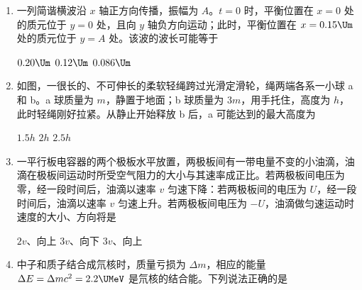 \documentclass[\gkver]{gaokaozhenti}
\begin{document}
\begin{enumerate}
\item
一列简谐横波沿 $x$ 轴正方向传播，振幅为 $A$。$t=0$ 时，平衡位置在 $x=0$ 处的质元位于 $y=0$ 处，且向 $y$ 轴负方向运动；此时，平衡位置在 $x=0.15\Um$ 处的质元位于 $y=A$ 处。该波的波长可能等于

\fourchoices[answer=AC]
{$0.60\Um$}
{$0.20\Um$}
{$0.12\Um$}
{$0.086\Um$}


\item
如图，一很长的、不可伸长的柔软轻绳跨过光滑定滑轮，绳两端各系一小球 a 和 b。a 球质量为 $m$，静置于地面；b 球质量为 $3m$，用手托住，高度为 $h$，此时轻绳刚好拉紧。从静止开始释放 b 后，a 可能达到的最大高度为


{$1.5h$}
{$2h$}
{$2.5h$}


\item
一平行板电容器的两个极板水平放置，两极板间有一带电量不变的小油滴，油滴在极板间运动时所受空气阻力的大小与其速率成正比。若两极板间电压为零，经一段时间后，油滴以速率 $v$ 匀速下降：若两极板间的电压为 $U$，经一段时间后，油滴以速率 $v$ 匀速上升。若两极板间电压为 $-U$，油滴做匀速运动时速度的大小、方向将是

{$2v$、向上}
{$3v$、向下}
{$3v$、向上}


\item
中子和质子结合成氘核时，质量亏损为 $\Delta m$，相应的能量 $\Delta E=\Delta mc^{2}=2.2\UMeV$ 是氘核的结合能。下列说法正确的是


\end{enumerate}
\end{document}
